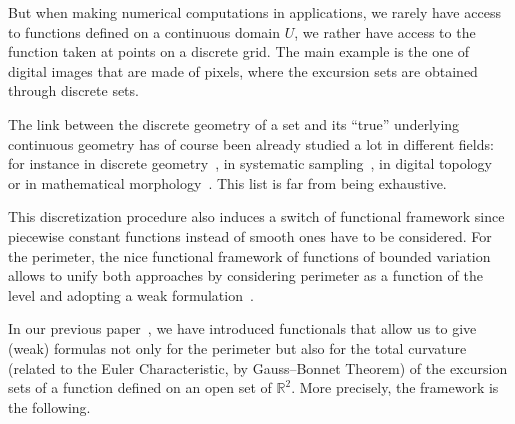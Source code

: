 \documentclass[10pt]{amsart}
\theoremstyle{definition}\newtheorem{defi}[theo]{Definition}\newtheorem{rema}[theo]{Remark}\newtheorem{exam}[theo]{Example}\newtheorem{exem}[theo]{Example}\newtheorem{nota}[theo]{Notation}
\newcommand{\R}{\mathbb{R}}
\begin{document}
But when making numerical computations in applications, we rarely have access to functions defined on a continuous domain $U$, we rather have access to the function taken at points on a discrete grid. The main example is the one of digital images that are made of pixels, where the excursion sets are obtained through discrete sets.

The link between the discrete geometry of a set and its ``true'' underlying continuous geometry has of course been already studied a lot in different fields: for instance in discrete geometry~\cite{Klenk06,Svane2014,Svane2015}, in systematic sampling~\cite{GundersenJensen87}, in digital topology~\cite{Gray71,Pratt07} or in mathematical morphology~\cite{MatheronBook, SerraBook}. This list is far from being exhaustive.



This discretization procedure also induces a switch of functional framework since piecewise constant functions instead of smooth ones have to be considered. For the perimeter, the nice functional framework of functions of bounded variation~\cite{AmbrosioFP} allows to unify both approaches by considering perimeter as a function of the level and adopting a weak formulation~\cite{BD-A0P-2016}.



In our previous paper~\cite{BD-Geometry-published}, we have introduced functionals that allow us to give (weak) formulas not only for the perimeter but also for the total curvature (related to the Euler Characteristic, by Gauss--Bonnet Theorem) of the excursion sets of a function defined on an open set of $\R^2$. More precisely, the framework is the following.
\end{document}
